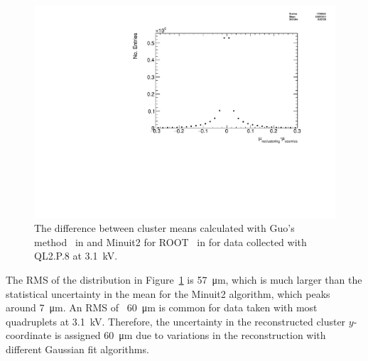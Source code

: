\begin{figure}
    \centering
    \includegraphics[width = \textwidth]{figures/figure_QL2P08_3100V_2021-05-21_reclustering_plots_mu_reclustering_minus_mu_cosmics.pdf}
    \caption{The difference between cluster means calculated with Guo's method~\cite{guo_simple_2011} in  and Minuit2 for ROOT~\cite{hatlo_developments_2005} in  for data collected with QL2.P.8 at 3.1~kV.}
    \label{fig:mu_reclustering_minus_mu_cosmics}
\end{figure}

The RMS of the distribution in Figure~\ref{fig:mu_reclustering_minus_mu_cosmics} is \SI{57}{\micro\meter}, which is much larger than the statistical uncertainty in the mean for the Minuit2 algorithm, which peaks around \SI{7}{\micro\meter}. An RMS of ~\SI{60}{\micro\meter} is common for data taken with most quadruplets at 3.1~kV. Therefore, the uncertainty in the reconstructed cluster $y$-coordinate is assigned \SI{60}{\micro\meter} due to variations in the reconstruction with different Gaussian fit algorithms.


